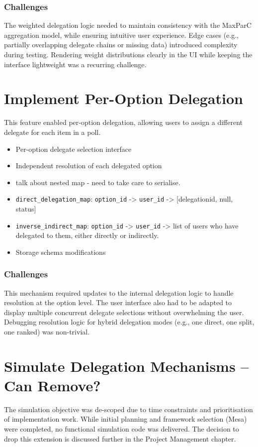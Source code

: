 \subsubsection{Challenges}
The weighted delegation logic needed to maintain consistency with the MaxParC aggregation model, while ensuring intuitive user experience. Edge cases (e.g., partially overlapping delegate chains or missing data) introduced complexity during testing. Rendering weight distributions clearly in the UI while keeping the interface lightweight was a recurring challenge.

\section{Implement Per-Option Delegation}
This feature enabled per-option delegation, allowing users to assign a different delegate for each item in a poll.

\begin{itemize}
  \item Per-option delegate selection interface
  \item Independent resolution of each delegated option
  \item talk about nested map - need to take care to serialise.
  \item \verb|direct_delegation_map|: \verb|option_id| -> \verb|user_id| -> [delegationid, null, status]
  \item \verb|inverse_indirect_map|: \verb|option_id| -> \verb|user_id| -> list of users who have delegated to them, either directly or indirectly.
  \item Storage schema modifications
\end{itemize}

\subsubsection{Challenges}
This mechanism required updates to the internal delegation logic to handle resolution at the option level. The user interface also had to be adapted to display multiple concurrent delegate selections without overwhelming the user. Debugging resolution logic for hybrid delegation modes (e.g., one direct, one split, one ranked) was non-trivial.

\section{Simulate Delegation Mechanisms -- Can Remove?}
The simulation objective was de-scoped due to time constraints and prioritisation of implementation work. While initial planning and framework selection (Mesa) were completed, no functional simulation code was delivered. The decision to drop this extension is discussed further in the Project Management chapter.

